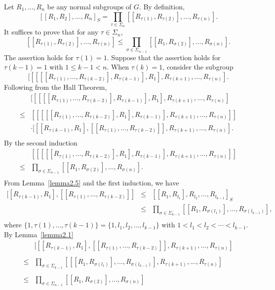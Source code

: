 \documentclass[10pt]{amsart}
\numberwithin{equation}{section}
\begin{document}
Let $R_1,\ldots, R_n$ be any normal subgroups of $G$. By definition, $$[[R_1,R_2],\ldots,R_n]_S=\prod\limits_{\tau\in \Sigma_{n}}[[R_{\tau(1)},R_{\tau(2)}],\ldots,R_{\tau(n)}].$$ It suffices to prove that for any $\tau\in \Sigma_n$, $$[[R_{\tau(1)},R_{\tau(2)}],\ldots,R_{\tau(n)}]\leq \prod_{\sigma\in \Sigma_{n-1}}[[R_{1},R_{\sigma(2)}],\ldots,R_{\sigma(n)}].$$
The assertion holds for  $\tau(1)=1$.
Suppose that the assertion holds for $\tau(k-1)=1$ with $1\leq k-1<n$.
When $\tau(k)=1$, consider the subgroup $$[[[[[R_{\tau(1)},\ldots,R_{\tau(k-2)}],R_{\tau(k-1)}],R_1],R_{\tau(k+1)},\ldots,R_{\tau(n)}].$$
Following from the Hall Theorem,
$$
\begin{array}{rl}
&[[[[[R_{\tau(1)},\ldots, R_{\tau(k-2)}],R_{\tau(k-1)}],R_1],R_{\tau(k+1)},\ldots,R_{\tau(n)}]\\
&\\
\leq &[[[[[R_{\tau(1)},\ldots,R_{\tau(k-2)}],R_1],R_{\tau(k-1)}], R_{\tau(k+1)},\ldots,R_{\tau(n)}]]\\
&\cdot[   [[R_{\tau{(k-1)}},R_1], [[R_{\tau(1)},\ldots, R_{\tau(k-2)}]],   R_{\tau(k+1)},\ldots,R_{\tau(n)}                                                 ].\\
\end{array}
$$
By the second induction $$
\begin{array}{rl}
&[[[[[R_{\tau(1)},\ldots,R_{\tau(k-2)}],R_1],R_{\tau(k-1)}], R_{\tau(k+1)},\ldots,R_{\tau(n)}]]\\
\leq &\prod\limits_{\sigma\in \Sigma_{n-1}}[[R_{1},R_{\sigma(2)}],\ldots,R_{\sigma(n)}].\\
\end{array}
$$
From Lemma~\ref{lemma2.5} and the first induction, we have
$$
\begin{array}{rcl}
[[R_{\tau{(k-1)}},R_1], [[R_{\tau(1)},\ldots, R_{\tau(k-2)}]]&\leq& [[R_1,R_{l_1}],R_{l_2},\ldots,R_{l_{k-1}}]_S\\
&\leq& \prod\limits_{\sigma\in \Sigma_{k-1}}[[R_{1},R_{\sigma(l_1)}],\ldots,R_{\sigma(l_{k-1})}],\\
\end{array} $$
where
$\{1,\tau(1),\ldots,\tau{(k-1)}\}=\{1,l_1,l_2,\ldots,l_{k-1}\}$ with $1<l_1<l_2<\cdots<l_{k-1}$.
By Lemma~\ref{lemma2.1}
$$
\begin{array}{rl}
&[  [[R_{\tau{(k-1)}},R_1], [[R_{\tau(1)},\ldots, R_{\tau(k-2)}]],   R_{\tau(k+1)},\ldots,R_{\tau(n)}                                                 ]\\
&\\
\leq &\prod\limits_{\sigma\in \Sigma_{k-1}}[ [[R_{1},R_{\sigma(l_1)}],\ldots,R_{\sigma(l_{k-1})}],R_{\tau(k+1)},\ldots,R_{\tau(n)}                                                 ]\\
&\\
\leq &\prod\limits_{\sigma\in \Sigma_{n-1}}[[R_{1},R_{\sigma(2)}],\ldots,R_{\sigma(n)}]\\
\end{array}
$$
\end{document}
